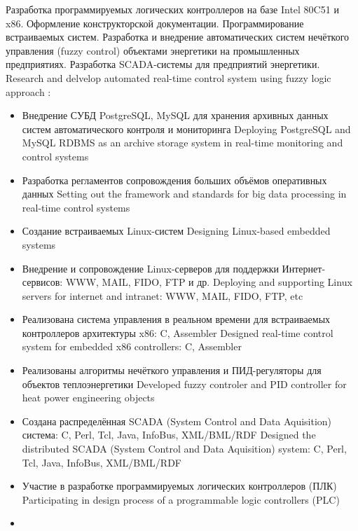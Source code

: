 \documentclass[11pt,a4paper,sans, russian]{moderncv}        %
\begin{document}
{
{Разработка программируемых логических контроллеров на базе Intel 80C51 и x86. Оформление конструкторской документации. Программирование встраиваемых систем. Разработка и внедрение автоматических систем нечёткого управления (fuzzy control) объектами энергетики на промышленных предприятиях. Разработка SCADA-системы для предприятий энергетики.}
{Research and delvelop automated real-time control system using fuzzy logic approach}
\newline{}
\achievements:
\begin{itemize}
	\item {}
		{Внедрение СУБД PostgreSQL, MySQL для хранения архивных данных систем автоматического контроля и мониторинга}
		{Deploying PostgreSQL and MySQL RDBMS as an archive storage system in real-time monitoring and control systems}
	\item {}
		{Разработка регламентов сопровождения больших объёмов оперативных данных}
		{Setting out the framework and standards for big data processing in real-time control systems}
	\item {}
		{Создание встраиваемых Linux-систем}
		{Designing Linux-based embedded systems}
	\item {}
		{Внедрение и сопровождение Linux-серверов для поддержки Интернет-сервисов: WWW, MAIL, FIDO, FTP и др.}
		{Deploying and supporting Linux servers for internet and intranet: WWW, MAIL, FIDO, FTP, etc}
	\item {}
		{Реализована система управления в реальном времени для встраиваемых контроллеров архитектуры x86: C, Assembler}
		{Designed real-time control system for embedded x86 controllers: C, Assembler}
	\item {}
		{Реализованы алгоритмы нечёткого управления и ПИД-регуляторы для объектов теплоэнергетики}
		{Developed fuzzy controler and PID controller for heat power engineering objects}
	\item {}
		{Создана распределённая SCADA (System Control and Data Aquisition) система: C, Perl, Tcl, Java, InfoBus, XML/BML/RDF}
		{Designed the distributed SCADA (System Control and Data Aquisition) system: C, Perl, Tcl, Java, InfoBus, XML/BML/RDF }
	\item {}
		{Участие в разработке программируемых логических контроллеров (ПЛК)}
		{Participating in design process of a programmable logic controllers (PLC)}
	\item {}

\end{itemize}}
\end{document}
